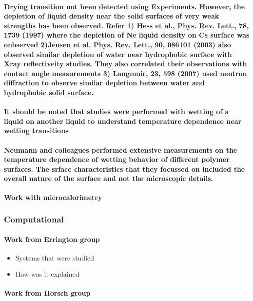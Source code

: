 \documentclass[a4paper,12pt,single,pdftex]{scrartcl}
\begin{document}
\label{ID_1447496666}\paragraph{Drying transition not been detected using Experiments. However, the depletion of liquid density near the solid surfaces of very weak strengths has been observed. Refer 1) Hess et al., Phys. Rev. Lett., 78, 1739 (1997) where the depletion of Ne liquid density on Cs surface was onbserved 2)Jensen et al. Phys. Rev. Lett., 90, 086101 (2003) also observed similar depletion of water near hydrophobic surface with Xray reflectiveity studies. They also correlated their observations with contact angle measurements 3) Langmuir, 23, 598 (2007) used neutron diffraction to observe similar depletion between water and hydrophobic solid surface.}

\label{ID_1486553890}\paragraph{It should be noted that studies were performed with wetting of a liquid on another liquid to understand temperature dependence near wetting transitions}

\label{ID_121688724}\paragraph{Neumann and colleagues performed extensive measurements on the temperature dependence of wetting behavior of different polymer surfaces. The srface characteristics that they focussed on included the overall nature of the surface and  not the microscopic details.}

\label{ID_1314084600}\paragraph{Work with microcalorimetry}

\label{ID_1521593594}\subsubsection{Computational}

\label{ID_1690050024}\paragraph{Work from Errington group}

\begin{itemize}
\label{ID_473109498}\item Systems that were studied
\label{ID_1487682070}\item How was it explained
\end{itemize}
\label{ID_473109498}\label{ID_1487682070}\label{ID_980454220}\paragraph{Work from Horsch group}
\end{document}
